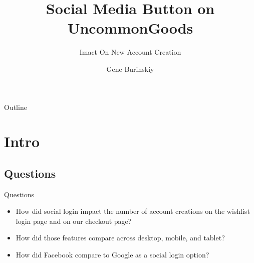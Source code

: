 \documentclass{beamer}
\title{Social Media Button on UncommonGoods}
\subtitle{Imact On New Account Creation}
\author{Gene Burinskiy }
\begin{document}
	\begin{frame}
		\titlepage
	\end{frame}
	
	\begin{frame}{Outline}
		
		\tiny
		\tableofcontents
	\end{frame}
	
	\section{Intro}
		\subsection{Questions}
		\begin{frame}{Questions}
			\begin{block}{}
			\begin{itemize}
				\item How did social login impact the number of account creations on the wishlist login page and on our checkout page?
				\item How did those features compare across desktop, mobile, and tablet?
				\item How did Facebook compare to Google as a social login option?
			\end{itemize}
			\end{block}
		\end{frame}	
	 
\end{document}
